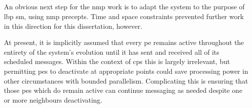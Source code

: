 
\subsection{}
An obvious next step for the \gls{nmp} work is to adapt the system to the purpose of \gls{lbp} \gls{sm}, using \gls{nmp} precepts.  Time and space constraints prevented further work in this direction for this dissertation, however.%

At present, it is implicitly assumed that every \gls{pe} remains active throughout the entirety of the system's evolution until it has sent and received all of its scheduled messages.  Within the context of \gls{cps} this is largely irrelevant, but permitting \glspl{pe} to deactivate at appropriate points could save processing power in other circumstances with bounded parallelism.  Complicating this is ensuring that those \glspl{pe} which do remain active can continue messaging as needed despite one or more neighbours deactivating.



